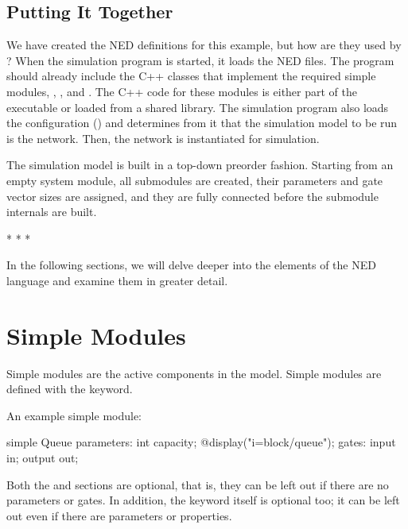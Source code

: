 \subsection{Putting It Together}
\label{sec:ned-lang:warmup:putting-it-together}

We have created the NED definitions for this example, but how are they used by
{\opp}? When the simulation program is started, it loads the NED files. The
program should already include the C++ classes that implement the required
simple modules, , , and . The C++ code for
these modules is either part of the executable or loaded from a shared library.
The simulation program also loads the configuration ()
and determines from it that the simulation model to be run is the 
network. Then, the network is instantiated for simulation.

The simulation model is built in a top-down preorder fashion. Starting from an
empty system module, all submodules are created, their parameters and gate
vector sizes are assigned, and they are fully connected before the submodule
internals are built.

\bigskip
\begin{center}
* * *
\end{center}
\bigskip

In the following sections, we will delve deeper into the elements of the NED
language and examine them in greater detail.



\section{Simple Modules}
\label{sec:ned-lang:simple-modules}

Simple modules are the active components in the model.
Simple modules are defined with the  keyword.

An example simple module:

\begin{ned}
simple Queue
{
    parameters:
        int capacity;
        @display("i=block/queue");
    gates:
        input in;
        output out;
}
\end{ned}

Both the  and  sections are optional, that is,
they can be left out if there are no parameters or gates. In addition, the
 keyword itself is optional too; it can be left out
even if there are parameters or properties.

